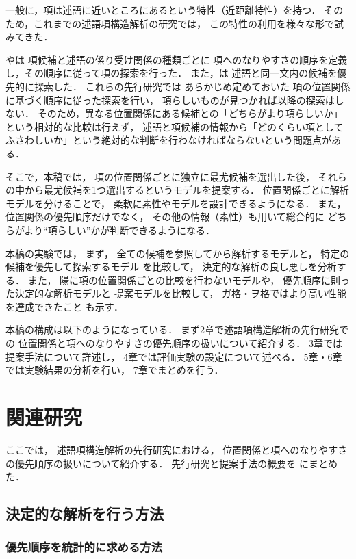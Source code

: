 \documentclass[japanese]{jnlp_1.4}
\newcommand{\tblref}[1]{}
\newcommand{\newcite}[1]{}
\begin{document}
一般に，項は述語に近いところにあるという特性（近距離特性）を持つ．
そのため，これまでの述語項構造解析の研究では，
この特性の利用を様々な形で試みてきた．

\newcite{Kawahara:2004:JNLP}やは
項候補と述語の係り受け関係の種類ごとに
項へのなりやすさの順序を定義し，その順序に従って項の探索を行った．
また，は
述語と同一文内の候補を優先的に探索した．
これらの先行研究では
あらかじめ定めておいた
項の位置関係に基づく順序に従った探索を行い，
項らしいものが見つかれば以降の探索はしない．
そのため，異なる位置関係にある候補との「どちらがより項らしいか」という相対的な比較は行えず，
述語と項候補の情報から「どのくらい項としてふさわしいか」という絶対的な判断を行わなければならないという問題点がある．


そこで，本稿では，
項の位置関係ごとに独立に最尤候補を選出した後，
それらの中から最尤候補を1つ選出するというモデルを提案する．
位置関係ごとに解析モデルを分けることで，
柔軟に素性やモデルを設計できるようになる．
また，
位置関係の優先順序だけでなく，
その他の情報（素性）も用いて総合的に
どちらがより``項らしい''かが判断できるようになる．


本稿の実験では，
まず，
全ての候補を参照してから解析するモデルと，
特定の候補を優先して探索するモデル
を比較して，
決定的な解析の良し悪しを分析する．
また，
陽に項の位置関係ごとの比較を行わないモデルや，
優先順序に則った決定的な解析モデルと
提案モデルを比較して，
ガ格・ヲ格ではより高い性能を達成できたこと
も示す．


本稿の構成は以下のようになっている．
まず2章で述語項構造解析の先行研究での
位置関係と項へのなりやすさの優先順序の扱いについて紹介する．
3章では提案手法について詳述し，
4章では評価実験の設定について述べる．
5章・6章では実験結果の分析を行い，
7章でまとめを行う．


\section{関連研究}

ここでは，
述語項構造解析の先行研究における，
位置関係と項へのなりやすさの優先順序の扱いについて紹介する．
先行研究と提案手法の概要を
\tblref{tbl:rwork}にまとめた．

\subsection{決定的な解析を行う方法}

\subsubsection{優先順序を統計的に求める方法}
\end{document}
